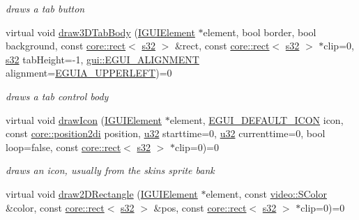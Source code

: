 \begin{DoxyCompactItemize}
\begin{DoxyCompactList}\small\item\em draws a tab button \end{DoxyCompactList}\item 
virtual void \hyperlink{classirr_1_1gui_1_1IGUISkin_aeacbaa90b32b9665100320520d1d983f}{draw3\+D\+Tab\+Body} (\hyperlink{classirr_1_1gui_1_1IGUIElement}{I\+G\+U\+I\+Element} $\ast$element, bool border, bool background, const \hyperlink{classirr_1_1core_1_1rect}{core\+::rect}$<$ \hyperlink{namespaceirr_ac66849b7a6ed16e30ebede579f9b47c6}{s32} $>$ \&rect, const \hyperlink{classirr_1_1core_1_1rect}{core\+::rect}$<$ \hyperlink{namespaceirr_ac66849b7a6ed16e30ebede579f9b47c6}{s32} $>$ $\ast$clip=0, \hyperlink{namespaceirr_ac66849b7a6ed16e30ebede579f9b47c6}{s32} tab\+Height=-\/1, \hyperlink{namespaceirr_1_1gui_a19eb5fb40e67f108cb16aba922ddaa2d}{gui\+::\+E\+G\+U\+I\+\_\+\+A\+L\+I\+G\+N\+M\+E\+NT} alignment=\hyperlink{namespaceirr_1_1gui_a19eb5fb40e67f108cb16aba922ddaa2da29a8bc6d2531cca02458ca8809aa2b75}{E\+G\+U\+I\+A\+\_\+\+U\+P\+P\+E\+R\+L\+E\+FT})=0
\begin{DoxyCompactList}\small\item\em draws a tab control body \end{DoxyCompactList}\item 
virtual void \hyperlink{classirr_1_1gui_1_1IGUISkin_a121399252e149f6977eb6cc706dd5867}{draw\+Icon} (\hyperlink{classirr_1_1gui_1_1IGUIElement}{I\+G\+U\+I\+Element} $\ast$element, \hyperlink{namespaceirr_1_1gui_a8e54aa253459daf0b62670bda4556d9f}{E\+G\+U\+I\+\_\+\+D\+E\+F\+A\+U\+L\+T\+\_\+\+I\+C\+ON} icon, const \hyperlink{namespaceirr_1_1core_ace0f1379db5f9f5660456ec57ab78202}{core\+::position2di} position, \hyperlink{namespaceirr_a0416a53257075833e7002efd0a18e804}{u32} starttime=0, \hyperlink{namespaceirr_a0416a53257075833e7002efd0a18e804}{u32} currenttime=0, bool loop=false, const \hyperlink{classirr_1_1core_1_1rect}{core\+::rect}$<$ \hyperlink{namespaceirr_ac66849b7a6ed16e30ebede579f9b47c6}{s32} $>$ $\ast$clip=0)=0
\begin{DoxyCompactList}\small\item\em draws an icon, usually from the skin\textquotesingle{}s sprite bank \end{DoxyCompactList}\item 
virtual void \hyperlink{classirr_1_1gui_1_1IGUISkin_a137082ed352db8dcb713449dfba0ff3e}{draw2\+D\+Rectangle} (\hyperlink{classirr_1_1gui_1_1IGUIElement}{I\+G\+U\+I\+Element} $\ast$element, const \hyperlink{classirr_1_1video_1_1SColor}{video\+::\+S\+Color} \&color, const \hyperlink{classirr_1_1core_1_1rect}{core\+::rect}$<$ \hyperlink{namespaceirr_ac66849b7a6ed16e30ebede579f9b47c6}{s32} $>$ \&pos, const \hyperlink{classirr_1_1core_1_1rect}{core\+::rect}$<$ \hyperlink{namespaceirr_ac66849b7a6ed16e30ebede579f9b47c6}{s32} $>$ $\ast$clip=0)=0

\end{DoxyCompactItemize}
